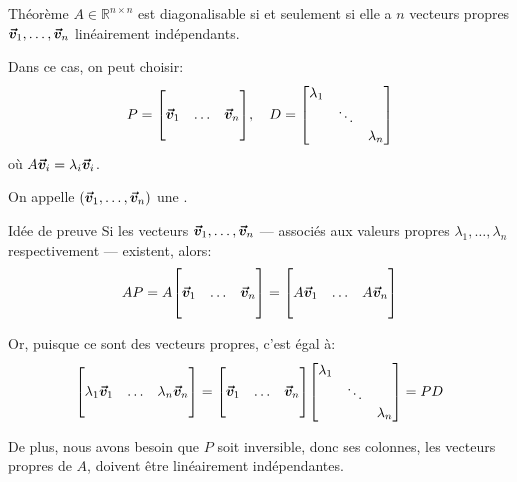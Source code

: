 \documentclass[a4paper]{article}
\begin{document}
\begin{parag}{Théorème}
    $A \in \mathbb{R}^{n \times n}$ est diagonalisable si et seulement si elle a $n$ vecteurs propres $\bm{\protect\vec{v}}_1, \ldots, \bm{\protect\vec{v}}_n$ linéairement indépendants.

    Dans ce cas, on peut choisir: 
    \[P = \begin{bmatrix} & &  \\ \bvec{v}_1 & \ldots & \bvec{v}_n \\  &  &  \end{bmatrix}, \mathspace D = \begin{bmatrix} \lambda_1 &  &  \\  & \ddots &  \\  &  & \lambda_n \end{bmatrix} \]
    où $A \bm{\protect\vec{v}}_i = \lambda_i \bm{\protect\vec{v}}_i$.
    
    On appelle $\left(\bvec{v}_1, \ldots, \bvec{v}_n\right)$ une .

    \begin{subparag}{Idée de preuve}
        Si les vecteurs  $\bm{\protect\vec{v}}_1, \ldots, \bm{\protect\vec{v}}_n$ --- associés aux valeurs propres $\lambda_1, \ldots, \lambda_n$ respectivement --- existent, alors: 
        \[AP = A\begin{bmatrix}  &  &  \\ \bvec{v}_1 & \ldots & \bvec{v}_n \\  &  &  \end{bmatrix} = \begin{bmatrix}  &  &  \\ A \bvec{v}_1 & \ldots & A \bvec{v}_n \\  &  &  \end{bmatrix}\]

        Or, puisque ce sont des vecteurs propres, c'est égal à:
        \[\begin{bmatrix}  &  &  \\ \lambda_1 \bvec{v}_1 & \ldots & \lambda_n \bvec{v}_n \\  &  &  \end{bmatrix} = \begin{bmatrix}  &  &  \\ \bvec{v}_1 & \ldots & \bvec{v}_n \\  &  &  \end{bmatrix} \begin{bmatrix} \lambda_1 &  &  \\  & \ddots &  \\  &  & \lambda_n \end{bmatrix} = PD\]
         
        De plus, nous avons besoin que $P$ soit inversible, donc ses colonnes, les vecteurs propres de $A$, doivent être linéairement indépendantes.
    \end{subparag}
\end{parag}
\end{document}
